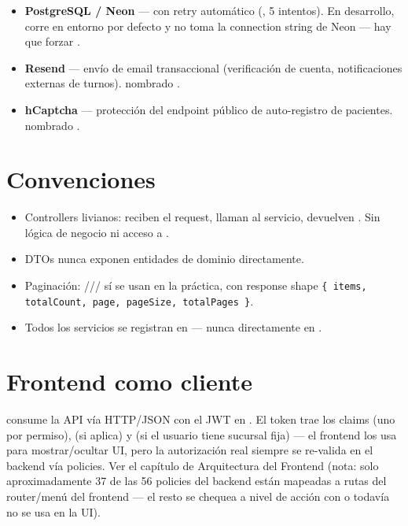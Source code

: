 \begin{itemize}
  \item \textbf{PostgreSQL / Neon} ---  con retry automático (\allowbreak {}\allowbreak {}\allowbreak {}, 5 intentos). En desarrollo,  corre en entorno  por defecto y no toma la connection string de Neon --- hay que forzar \allowbreak {}.
  \item \textbf{Resend} --- envío de email transaccional (verificación de cuenta, notificaciones externas de turnos).  nombrado .
  \item \textbf{hCaptcha} --- protección del endpoint público de auto-registro de pacientes.  nombrado .
\end{itemize}

\section{Convenciones}
\label{sec:arch-convenciones}

\begin{itemize}
  \item Controllers livianos: reciben el request, llaman al servicio, devuelven \allowbreak {}\allowbreak {}. Sin lógica de negocio ni acceso a .
  \item DTOs nunca exponen entidades de dominio directamente.
  \item Paginación: /// sí se usan en la práctica, con response shape \texttt{\{ items, totalCount, page, pageSize, totalPages \}}.
  \item Todos los servicios se registran en \allowbreak {}\allowbreak {}\allowbreak {} --- nunca directamente en .
\end{itemize}

\section{Frontend como cliente}
\label{sec:arch-frontend-cliente}

 consume la API vía HTTP/JSON con el JWT en . El token trae los claims  (uno por permiso),  (si aplica) y  (si el usuario tiene sucursal fija) --- el frontend los usa para mostrar/ocultar UI, pero la autorización real siempre se re-valida en el backend vía policies. Ver el capítulo de Arquitectura del Frontend (nota: solo aproximadamente 37 de las 56 policies del backend están mapeadas a rutas del router/menú del frontend --- el resto se chequea a nivel de acción con  o todavía no se usa en la UI).
